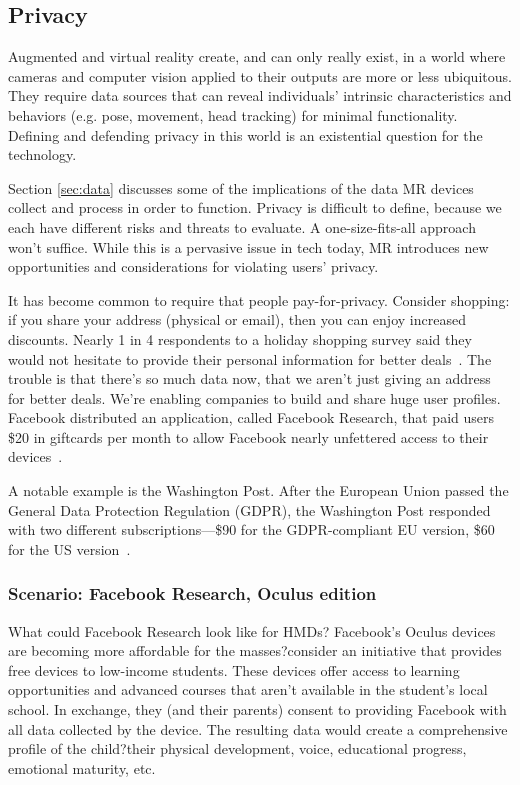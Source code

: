 

\subsection{Privacy}
Augmented and virtual reality create, and can only really exist, in a world where cameras and computer vision applied to their outputs are more or less ubiquitous. They require data sources that can reveal individuals' intrinsic characteristics and behaviors (e.g. pose, movement, head tracking) for minimal functionality. Defining and defending privacy in this world is an existential question for the technology.

Section \ref{sec:data} discusses some of the implications of the data MR devices collect and process in order to function. Privacy is difficult to define, because we each have different risks and threats to evaluate. A one-size-fits-all approach won't suffice. While this is a pervasive issue in tech today, MR introduces new opportunities and considerations for violating users' privacy.

It has become common to require that people pay-for-privacy. Consider shopping: if you share your address (physical or email), then you can enjoy increased discounts. Nearly 1 in 4 respondents to a holiday shopping survey said they would not hesitate to provide their personal information for better deals~\cite{moses}. The trouble is that there's so much data now, that we aren't just giving an address for better deals. We're enabling companies to build and share huge user profiles. Facebook distributed an application, called Facebook Research, that paid users \$20 in giftcards per month to allow Facebook nearly unfettered access to their devices~\cite{axon}.

A notable example is the Washington Post. After the European Union passed the General Data Protection Regulation (GDPR), the Washington Post responded with two different subscriptions---\$90 for the GDPR-compliant EU version, \$60 for the US version~\cite{karl}.

\subsubsection{Scenario: Facebook Research, Oculus edition}

What could Facebook Research look like for HMDs? Facebook's Oculus devices are becoming more affordable for the masses?consider an initiative that provides free devices to low-income students. These devices offer access to learning opportunities and advanced courses that aren't available in the student's local school. In exchange, they (and their parents) consent to providing Facebook with all data collected by the device. The resulting data would create a comprehensive profile of the child?their physical development, voice, educational progress, emotional maturity, etc.

